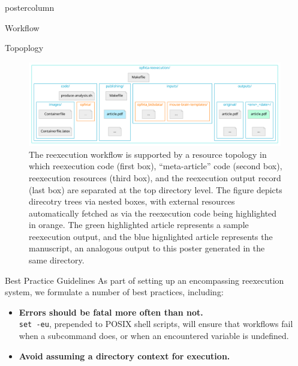\begin{frame}
\begin{columns}
\begin{column}{.42\textwidth}
\begin{beamercolorbox}[center]{postercolumn}
\begin{minipage}{.98\textwidth}
{\begin{myblock}{Workflow}
\begin{figure}
{							}
						\end{figure}
					\end{myblock}\vfill
					\vspace{-0.3em}
					\begin{myblock}{Topoplogy}
						\vspace{0.5em}
						\begin{figure}
							\captionsetup{width=.9\linewidth}
							\includegraphics[width=0.99\textwidth]{img/topology.pdf}
							\caption{
								The reexecution workflow is supported by a resource topology in which reexecution code (first box), “meta-article” code (second box), reexecution resources (third box), and the reexecution output record (last box) are separated at the top directory level.
								The figure depicts direcotry trees via nested boxes, with external resources automatically fetched as via the reexecution code being highlighted in orange.
								The green highlighted article represents a sample reexecution output, and the blue hignlighted article represents the manuscript, an analogous output to this poster generated in the same directory.
							}
							\label{fig:workflow}
						\end{figure}
					\end{myblock}\vfill
					\begin{myblock}{Best Practice Guidelines}
						\vspace{0.5em}
						As part of setting up an encompassing reexecution system, we formulate a number of best practices, including:
						\begin{itemize}
							\item \textbf{Errors should be fatal more often than not.}\\
								\colorbox{elg}{\texttt{set -eu}}, prepended to POSIX shell scripts, will ensure that workflows fail when a subcommand does, or when an encountered variable is undefined.
							\item \textbf{Avoid assuming a directory context for execution.}\\

\end{itemize}
\end{myblock}}
\end{minipage}
\end{beamercolorbox}
\end{column}
\end{columns}
\end{frame}
